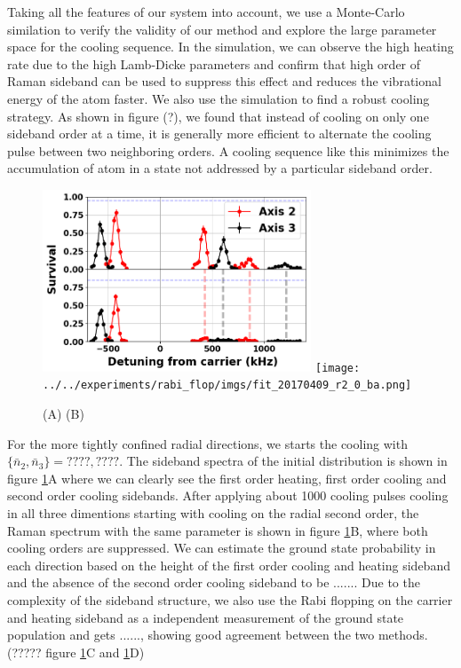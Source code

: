 \documentclass[aps,prl,twocolumn,groupedaddress]{revtex4-1}
\begin{document}
Taking all the features of our system into account, we use a Monte-Carlo similation to verify
the validity of our method and explore the large parameter space for the cooling sequence.
In the simulation, we can observe the high heating rate due to the high Lamb-Dicke parameters
and confirm that high order of Raman sideband can be used to suppress this effect and reduces
the vibrational energy of the atom faster.
We also use the simulation to find a robust cooling strategy. As shown in figure (?),
we found that instead of cooling on only one sideband order at a time, it is generally more
efficient to alternate the cooling pulse between two neighboring orders. A cooling sequence
like this minimizes the accumulation of atom in a state not addressed by a particular sideband order.\\

\begin{figure}
  \includegraphics[width=8cm]{imgs/spectrum_r.png}
  \texttt{[image: ../../experiments/rabi\_flop/imgs/fit\_20170409\_r2\_0\_ba.png]}
  \caption{(A) (B) \label{f-radial}}
\end{figure}

For the more tightly confined radial directions, we starts the cooling with $\{\bar n_2, \bar n_3\}=????, ????$. The sideband spectra of the initial distribution is shown in figure \ref{f-radial}A where we can clearly see the first order heating, first order cooling and second order cooling sidebands. After applying about 1000 cooling pulses cooling in all three dimentions starting with cooling on the radial second order, the Raman spectrum with the same parameter is shown in figure \ref{f-radial}B, where both cooling orders are suppressed. We can estimate the ground state probability in each direction based on the height of the first order cooling and heating sideband and the absence of the second order cooling sideband to be $......$. Due to the complexity of the sideband structure, we also use the Rabi flopping on the carrier and heating sideband as a independent measurement of the ground state population and gets $......$, showing good agreement between the two methods. (????? figure \ref{f-radial}C and \ref{f-radial}D)\\
\end{document}
